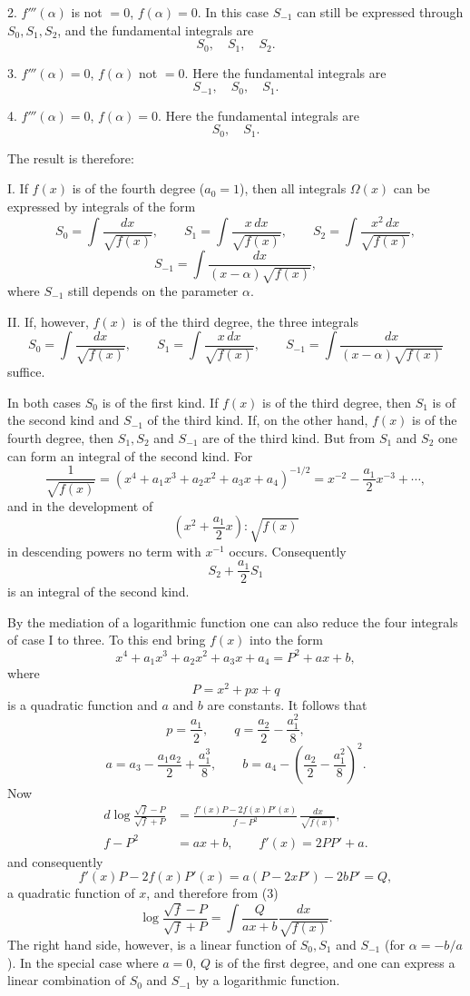 \documentclass[11pt]{article}
\begin{document}
2. $f'''(\alpha)$ is not $=0$, $f(\alpha)=0$. In this case $S_{-1}$ can still be expressed through $S_0,S_1,S_2$, and the fundamental integrals are
\[
S_0,\quad S_1,\quad S_2.
\]

3. $f'''(\alpha)=0$, $f(\alpha)$ not $=0$. Here the fundamental integrals are
\[
S_{-1},\quad S_0,\quad S_1.
\]

4. $f'''(\alpha)=0$, $f(\alpha)=0$. Here the fundamental integrals are
\[
S_0,\quad S_1.
\]

The result is therefore:

I. If $f(x)$ is of the fourth degree ($a_0=1$), then all integrals $\Omega(x)$ can be expressed by integrals of the form
\[
S_0=\int\frac{dx}{\sqrt{f(x)}},\qquad
S_1=\int\frac{x\,dx}{\sqrt{f(x)}},\qquad
S_2=\int\frac{x^2\,dx}{\sqrt{f(x)}},
\]
\[
S_{-1}=\int\frac{dx}{(x-\alpha)\sqrt{f(x)}},
\]
where $S_{-1}$ still depends on the parameter $\alpha$.

II. If, however, $f(x)$ is of the third degree, the three integrals
\[
S_0=\int\frac{dx}{\sqrt{f(x)}},\qquad
S_1=\int\frac{x\,dx}{\sqrt{f(x)}},\qquad
S_{-1}=\int\frac{dx}{(x-\alpha)\sqrt{f(x)}}
\]
suffice.

In both cases $S_0$ is of the first kind. If $f(x)$ is of the third degree, then $S_1$ is of the second kind and $S_{-1}$ of the third kind. If, on the other hand, $f(x)$ is of the fourth degree, then $S_1,S_2$ and $S_{-1}$ are of the third kind. But from $S_1$ and $S_2$ one can form an integral of the second kind. For
\[
\frac1{\sqrt{f(x)}}=(x^4+a_1x^3+a_2x^2+a_3x+a_4)^{-1/2}
=x^{-2}-\frac{a_1}{2}x^{-3}+\cdots,
\]
and in the development of
\[
\left(x^2+\frac{a_1}{2}x\right):\sqrt{f(x)}
\]
in descending powers no term with $x^{-1}$ occurs. Consequently
\[
S_2+\frac{a_1}{2}S_1
\]
is an integral of the second kind.

By the mediation of a logarithmic function one can also reduce the four integrals of case I to three. To this end bring $f(x)$ into the form
\[
x^4+a_1x^3+a_2x^2+a_3x+a_4=P^2+ax+b,
\]
where
\[
P=x^2+px+q
\]
is a quadratic function and $a$ and $b$ are constants. It follows that
\[
p=\frac{a_1}{2},\qquad q=\frac{a_2}{2}-\frac{a_1^2}{8},
\]
\[
a=a_3-\frac{a_1a_2}{2}+\frac{a_1^3}{8},\qquad
b=a_4-\left(\frac{a_2}{2}-\frac{a_1^2}{8}\right)^2.
\]
Now
\begin{equation}
\begin{aligned}
d\log\frac{\sqrt f-P}{\sqrt f+P}
&=
\frac{f'(x)P-2f(x)P'(x)}{f-P^2}\,
\frac{dx}{\sqrt{f(x)}},\\
f-P^2&=ax+b,\qquad f'(x)=2PP'+a.
\end{aligned}
\tag{3}
\end{equation}
and consequently
\[
f'(x)P-2f(x)P'(x)=a(P-2xP')-2bP'=Q,
\]
a quadratic function of $x$, and therefore from (3)
\begin{equation}
\log\frac{\sqrt f-P}{\sqrt f+P}
=
\int\frac{Q}{ax+b}\frac{dx}{\sqrt{f(x)}}.
\tag{4}
\end{equation}
The right hand side, however, is a linear function of $S_0,S_1$ and $S_{-1}$ (for $\alpha=-b/a$). In the special case where $a=0$, $Q$ is of the first degree, and one can express a linear combination of $S_0$ and $S_{-1}$ by a logarithmic function.
\end{document}

